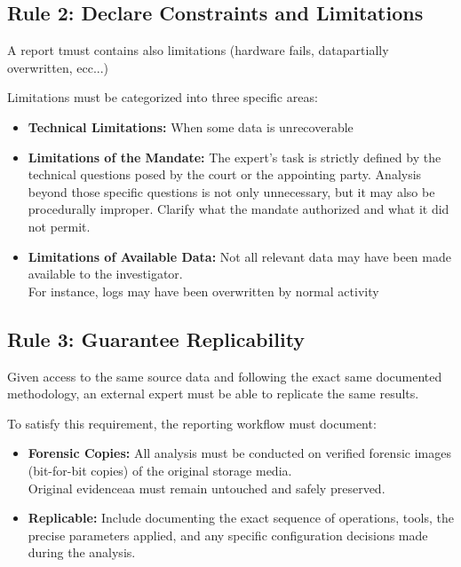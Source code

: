 \subsection{Rule 2: Declare Constraints and Limitations}
A report tmust contains also limitations (hardware fails, datapartially overwritten, ecc...)
\medskip

\noindent
Limitations must be categorized into three specific areas:
\begin{itemize}
    \item \textbf{Technical Limitations:} When some data is unrecoverable
    \item \textbf{Limitations of the Mandate:} The expert's task is strictly defined by the technical questions posed by the court or the appointing party. Analysis beyond those specific questions is not only unnecessary, but it may also be procedurally improper. Clarify what the mandate authorized and what it did not permit.
    \item \textbf{Limitations of Available Data:} Not all relevant data may have been made available to the investigator.\\
    For instance, logs may have been overwritten by normal activity 
\end{itemize}

\subsection{Rule 3: Guarantee Replicability}
Given access to the same source data and following the exact same documented methodology, an external expert must be able to replicate the same results. 
\medskip

\noindent
To satisfy this requirement, the reporting workflow must document:
\begin{itemize}
    \item \textbf{Forensic Copies:} All analysis must be conducted on verified forensic images (bit-for-bit copies) of the original storage media.\\
    Original evidenceaa must remain untouched and safely preserved.

    \item \textbf{Replicable:} Include documenting the exact sequence of operations, tools, the precise parameters applied, and any specific configuration decisions made during the analysis.
\end{itemize}

